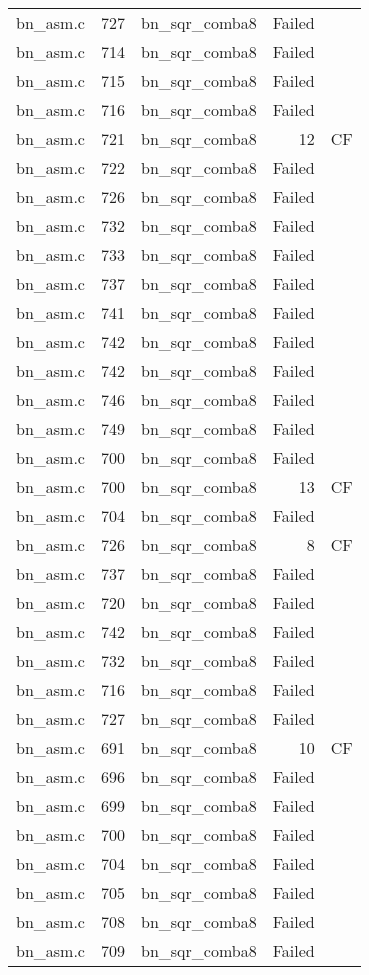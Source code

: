 \begin{table}[h]
{\begin{tabular}{clrrr}
bn\_asm.c&727&bn\_sqr\_comba8&Failed&\\
bn\_asm.c&714&bn\_sqr\_comba8&Failed&\\
bn\_asm.c&715&bn\_sqr\_comba8&Failed&\\
bn\_asm.c&716&bn\_sqr\_comba8&Failed&\\
bn\_asm.c&721&bn\_sqr\_comba8&12&CF\\
bn\_asm.c&722&bn\_sqr\_comba8&Failed&\\
bn\_asm.c&726&bn\_sqr\_comba8&Failed&\\
bn\_asm.c&732&bn\_sqr\_comba8&Failed&\\
bn\_asm.c&733&bn\_sqr\_comba8&Failed&\\
bn\_asm.c&737&bn\_sqr\_comba8&Failed&\\
bn\_asm.c&741&bn\_sqr\_comba8&Failed&\\
bn\_asm.c&742&bn\_sqr\_comba8&Failed&\\
bn\_asm.c&742&bn\_sqr\_comba8&Failed&\\
bn\_asm.c&746&bn\_sqr\_comba8&Failed&\\
bn\_asm.c&749&bn\_sqr\_comba8&Failed&\\
bn\_asm.c&700&bn\_sqr\_comba8&Failed&\\
bn\_asm.c&700&bn\_sqr\_comba8&13&CF\\
bn\_asm.c&704&bn\_sqr\_comba8&Failed&\\
bn\_asm.c&726&bn\_sqr\_comba8&8 &CF\\
bn\_asm.c&737&bn\_sqr\_comba8&Failed&\\
bn\_asm.c&720&bn\_sqr\_comba8&Failed&\\
bn\_asm.c&742&bn\_sqr\_comba8&Failed&\\
bn\_asm.c&732&bn\_sqr\_comba8&Failed&\\
bn\_asm.c&716&bn\_sqr\_comba8&Failed&\\
bn\_asm.c&727&bn\_sqr\_comba8&Failed&\\
bn\_asm.c&691&bn\_sqr\_comba8&10&CF\\
bn\_asm.c&696&bn\_sqr\_comba8&Failed&\\
bn\_asm.c&699&bn\_sqr\_comba8&Failed&\\
bn\_asm.c&700&bn\_sqr\_comba8&Failed&\\
bn\_asm.c&704&bn\_sqr\_comba8&Failed&\\
bn\_asm.c&705&bn\_sqr\_comba8&Failed&\\
bn\_asm.c&708&bn\_sqr\_comba8&Failed&\\
bn\_asm.c&709&bn\_sqr\_comba8&Failed&\\

\end{tabular}}
\end{table}
